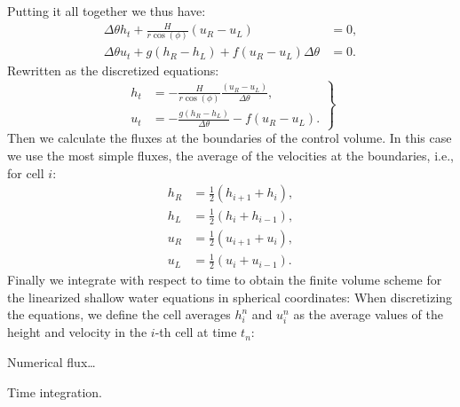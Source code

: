 Putting it all together we thus have:
\begin{equation}
    \begin{aligned}
        \Delta \theta h_t + \frac{H}{r \cos(\phi)} (u_R - u_L) &= 0, \\
        \Delta \theta u_t + g(h_R - h_L) + f(u_R - u_L) \Delta \theta &= 0.
    \end{aligned}
\end{equation}
Rewritten as the discretized equations:
\begin{equation}
    \left.
    \begin{aligned}
        h_t &= - \frac{H}{r \cos(\phi)} \frac{(u_R - u_L)}{\Delta \theta}, \\
        u_t &= - \frac{g (h_R - h_L)}{\Delta \theta}  - f(u_R - u_L).
    \end{aligned}
    \right\}
\end{equation}    
Then we calculate the fluxes at the boundaries of the control volume.
In this case we use the most simple fluxes, the average of the velocities at the boundaries, i.e., for cell $i$:
\begin{equation}
    \begin{aligned}
        h_R &= \frac{1}{2} (h_{i+1} + h_i), \\
        h_L &= \frac{1}{2} (h_i + h_{i-1}), \\
        u_R &= \frac{1}{2} (u_{i+1} + u_i), \\
        u_L &= \frac{1}{2} (u_i + u_{i-1}).
    \end{aligned}
\end{equation}
Finally we integrate with respect to time to obtain the finite volume scheme for the linearized shallow water equations in spherical coordinates:
When discretizing the equations, we define the cell averages $h_i^n$ and $u_i^n$ as the average values of the height and velocity in the $i$-th cell at time $t_n$:

Numerical flux\ldots

Time integration.



